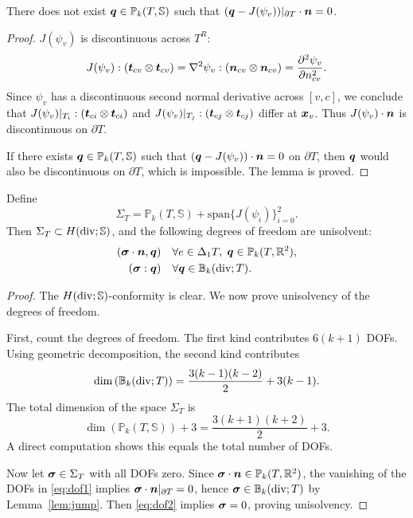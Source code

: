 \documentclass[letterpaper,12pt]{article}
\begin{document}
\begin{lemma}
\label{lem:jump}
There does not exist $\boldsymbol{q} \in \mathbb{P}_k(T, \mathbb{S})$ such that 
$(\boldsymbol{q} - J(\psi_v))|_{\partial T}\cdot \boldsymbol{n} = 0$.
\end{lemma}
\begin{proof}
$J(\psi_v)$ is discontinuous across $T^R$:
\[
J(\psi_v) : (\boldsymbol{t}_{cv}\otimes \boldsymbol{t}_{cv}) = 
\nabla^2 \psi_v : (\boldsymbol{n}_{cv}\otimes \boldsymbol{n}_{cv}) = 
\frac{\partial^2 \psi_v}{\partial n_{cv}^2}.
\]
Since $\psi_v$ has a discontinuous second normal derivative across $[v, c]$, we conclude that
$J(\psi_v)|_{T_i} : (\boldsymbol{t}_{ci}\otimes \boldsymbol{t}_{ci})$ and 
$J(\psi_v)|_{T_j} : (\boldsymbol{t}_{cj}\otimes \boldsymbol{t}_{cj})$ differ at $\boldsymbol{x}_v$.
Thus $J(\psi_v)\cdot \boldsymbol{n}$ is discontinuous on $\partial T$.

If there exists $\boldsymbol{q} \in \mathbb{P}_k(T, \mathbb{S})$ such that 
$(\boldsymbol{q} - J(\psi_v))\cdot \boldsymbol{n} = 0$ on $\partial T$, then $\boldsymbol{q}$ would also be discontinuous on $\partial T$, which is impossible. The lemma is proved.
\end{proof}

\begin{theorem}
\label{thm:hdivsdof2d}
Define
$$
\Sigma_T = \mathbb{P}_k(T, \mathbb{S}) + \mathrm{span}\{J(\psi_i)\}_{i=0}^2.
$$
Then $\Sigma_T \subset H(\mathop{\mathrm{div}}; \mathbb{S})$, and the following degrees of freedom are unisolvent:
\begin{align}
(\boldsymbol{\sigma}\cdot \boldsymbol{n}, \boldsymbol{q})  & \quad \forall e \in \Delta_1 T,\; \boldsymbol{q} \in \mathbb{P}_k(T, \mathbb{R}^2), \label{eq:dof1}\\
(\boldsymbol{\sigma} : \boldsymbol{q}) & \quad \forall \boldsymbol{q} \in \mathbb{B}_k(\mathop{\mathrm{div}}; T). \label{eq:dof2}
\end{align}
\end{theorem}
\begin{proof}
The $H(\mathop{\mathrm{div}}; \mathbb{S})$-conformity is clear. We now prove unisolvency of the degrees of freedom.

First, count the degrees of freedom. The first kind contributes $6(k+1)$ DOFs. Using geometric decomposition, the second kind contributes
\[
\dim\left(\mathbb{B}_k(\mathop{\mathrm{div}}; T)\right) = \frac{3(k-1)(k-2)}{2} + 3(k-1).
\]
The total dimension of the space $\Sigma_T$ is 
\[
\dim(\mathbb{P}_k(T, \mathbb{S})) + 3 = \frac{3(k+1)(k+2)}{2} + 3.
\]
A direct computation shows this equals the total number of DOFs.

Now let $\boldsymbol{\sigma} \in \Sigma_T$ with all DOFs zero. Since $\boldsymbol{\sigma}\cdot \boldsymbol{n} \in \mathbb{P}_k(T, \mathbb{R}^2)$, the vanishing of the DOFs in \eqref{eq:dof1} implies 
$\boldsymbol{\sigma} \cdot \boldsymbol{n}|_{\partial T} = 0$, hence $\boldsymbol{\sigma} \in \mathbb{B}_k(\mathop{\mathrm{div}}; T)$ by Lemma~\ref{lem:jump}. Then \eqref{eq:dof2} implies $\boldsymbol{\sigma} = 0$, proving unisolvency.
\end{proof}
\end{document}
